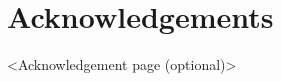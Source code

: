 %
\chapter*{Acknowledgements}
\label{sec::acknowledgement}


<Acknowledgement page (optional)>





